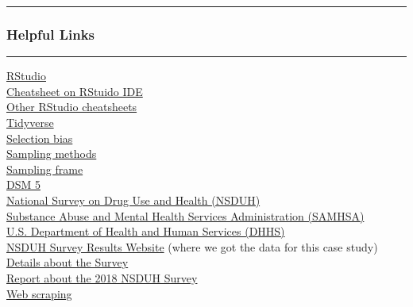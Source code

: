 \documentclass[
]{article}
\begin{document}
\begin{center}\rule{0.5\linewidth}{0.5pt}\end{center}

\hypertarget{helpful-links}{%
\subsubsection{\texorpdfstring{\textbf{Helpful
Links}}{Helpful Links}}\label{helpful-links}}

\begin{center}\rule{0.5\linewidth}{0.5pt}\end{center}

\href{https://rstudio.com/products/rstudio/features/}{RStudio}\\
\href{https://github.com/rstudio/cheatsheets/raw/master/rstudio-ide.pdf}{Cheatsheet
on RStuido IDE}\\
\href{https://rstudio.com/resources/cheatsheets/}{Other RStudio
cheatsheets}\\
\href{https://www.tidyverse.org/}{Tidyverse}\\
\href{https://en.wikipedia.org/wiki/Selection_bias?oldformat=true}{Selection
bias}\\
\href{https://en.wikipedia.org/wiki/Sampling_(statistics)?oldformat=true}{Sampling
methods}\\
\href{https://en.wikipedia.org/wiki/Sampling_frame?oldformat=true}{Sampling
frame}\\
\href{https://en.wikipedia.org/wiki/DSM-5}{DSM 5}\\
\href{https://nsduhweb.rti.org/respweb/homepage.cfm}{National Survey on
Drug Use and Health (NSDUH)}\\
\href{https://www.samhsa.gov/}{Substance Abuse and Mental Health
Services Administration (SAMHSA)}\\
\href{https://www.hhs.gov/}{U.S. Department of Health and Human Services
(DHHS)}\\
\href{https://www.samhsa.gov/data/sites/default/files/cbhsq-reports/NSDUHDetailedTabs2018R2/NSDUHDetTabsSect11pe2018.htm}{NSDUH
Survey Results Website} (where we got the data for this case study)\\
\href{https://nsduhweb.rti.org/respweb/about_nsduh.html}{Details about
the Survey}\\
\href{https://www.samhsa.gov/data/sites/default/files/cbhsq-reports/NSDUHDetailedTabs2018R2/NSDUHDetailedTabs2018.pdf}{Report
about the 2018 NSDUH Survey}\\
\href{https://en.wikipedia.org/wiki/Web_scraping?oldformat=true}{Web
scraping}\\
\end{document}
